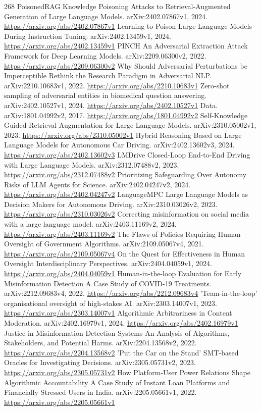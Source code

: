\documentclass[11pt]{article}
\begin{document}
\begin{thebibliography}{268}
 PoisonedRAG Knowledge Poisoning Attacks to Retrieval-Augmented Generation of Large Language Models. arXiv:2402.07867v1, 2024. \url{https://arxiv.org/abs/2402.07867v1}
 Learning to Poison Large Language Models During Instruction Tuning. arXiv:2402.13459v1, 2024. \url{https://arxiv.org/abs/2402.13459v1}
 PINCH An Adversarial Extraction Attack Framework for Deep Learning Models. arXiv:2209.06300v2, 2022. \url{https://arxiv.org/abs/2209.06300v2}
 Why Should Adversarial Perturbations be Imperceptible Rethink the Research Paradigm in Adversarial NLP. arXiv:2210.10683v1, 2022. \url{https://arxiv.org/abs/2210.10683v1}
 Zero-shot sampling of adversarial entities in biomedical question answering. arXiv:2402.10527v1, 2024. \url{https://arxiv.org/abs/2402.10527v1}
 Data. arXiv:1801.04992v2, 2017. \url{https://arxiv.org/abs/1801.04992v2}
 Self-Knowledge Guided Retrieval Augmentation for Large Language Models. arXiv:2310.05002v1, 2023. \url{https://arxiv.org/abs/2310.05002v1}
 Hybrid Reasoning Based on Large Language Models for Autonomous Car Driving. arXiv:2402.13602v3, 2024. \url{https://arxiv.org/abs/2402.13602v3}
 LMDrive Closed-Loop End-to-End Driving with Large Language Models. arXiv:2312.07488v2, 2023. \url{https://arxiv.org/abs/2312.07488v2}
 Prioritizing Safeguarding Over Autonomy Risks of LLM Agents for Science. arXiv:2402.04247v2, 2024. \url{https://arxiv.org/abs/2402.04247v2}
 LanguageMPC Large Language Models as Decision Makers for Autonomous Driving. arXiv:2310.03026v2, 2023. \url{https://arxiv.org/abs/2310.03026v2}
 Correcting misinformation on social media with a large language model. arXiv:2403.11169v2, 2024. \url{https://arxiv.org/abs/2403.11169v2}
 The Flaws of Policies Requiring Human Oversight of Government Algorithms. arXiv:2109.05067v4, 2021. \url{https://arxiv.org/abs/2109.05067v4}
 On the Quest for Effectiveness in Human Oversight Interdisciplinary Perspectives. arXiv:2404.04059v1, 2024. \url{https://arxiv.org/abs/2404.04059v1}
 Human-in-the-loop Evaluation for Early Misinformation Detection A Case Study of COVID-19 Treatments. arXiv:2212.09683v4, 2022. \url{https://arxiv.org/abs/2212.09683v4}
 'Team-in-the-loop' organisational oversight of high-stakes AI. arXiv:2303.14007v1, 2023. \url{https://arxiv.org/abs/2303.14007v1}
 Algorithmic Arbitrariness in Content Moderation. arXiv:2402.16979v1, 2024. \url{https://arxiv.org/abs/2402.16979v1}
 Justice in Misinformation Detection Systems An Analysis of Algorithms, Stakeholders, and Potential Harms. arXiv:2204.13568v2, 2022. \url{https://arxiv.org/abs/2204.13568v2}
 'Put the Car on the Stand' SMT-based Oracles for Investigating Decisions. arXiv:2305.05731v2, 2023. \url{https://arxiv.org/abs/2305.05731v2}
 How Platform-User Power Relations Shape Algorithmic Accountability A Case Study of Instant Loan Platforms and Financially Stressed Users in India. arXiv:2205.05661v1, 2022. \url{https://arxiv.org/abs/2205.05661v1}
\end{thebibliography}
\end{document}
